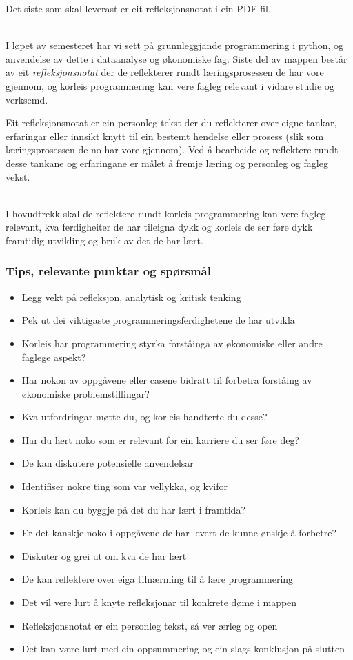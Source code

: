 \documentclass[12pt, titlepage]{article}
\begin{document}
Det siste som skal leverast er eit refleksjonsnotat i ein PDF-fil.

~\\
I løpet av semesteret har vi sett på grunnleggjande programmering i python, og anvendelse av dette i dataanalyse og økonomiske fag.
Siste del av mappen består av eit \textit{refleksjonsnotat} der de reflekterer rundt læringsprosessen de har vore gjennom, og korleis programmering kan vere fagleg relevant i vidare studie og verksemd.

Eit refleksjonsnotat er ein personleg tekst der du reflekterer over eigne tankar, erfaringar eller innsikt knytt til ein bestemt hendelse eller prosess (slik som læringsprosessen de no har vore gjennom).
Ved å bearbeide og reflektere rundt desse tankane og erfaringane er målet å fremje læring og personleg og fagleg vekst.

~\\
I hovudtrekk skal de reflektere rundt korleis programmering kan vere fagleg relevant, kva ferdigheiter de har tileigna dykk og korleis de ser føre dykk framtidig utvikling og bruk av det de har lært.\\
\subsubsection*{Tips, relevante punktar og spørsmål}
\begin{itemize}
   \item{Legg vekt på refleksjon, analytisk og kritisk tenking}
   \item{Pek ut dei viktigaste programmeringsferdighetene de har utvikla}
   \item{Korleis har programmering styrka forståinga av økonomiske eller andre faglege aspekt?}
   \item{Har nokon av oppgåvene eller casene bidratt til forbetra forståing av økonomiske problemstillingar?}
   \item{Kva utfordringar møtte du, og korleis handterte du desse?}
   \item{Har du lært noko som er relevant for ein karriere du ser føre deg?}
   \item{De kan diskutere potensielle anvendelsar}
   \item{Identifiser nokre ting som var vellykka, og kvifor}
   \item{Korleis kan du byggje på det du har lært i framtida?}
   \item{Er det kanskje noko i oppgåvene de har levert de kunne ønskje å forbetre?}
   \item{Diskuter og grei ut om kva de har lært}
   \item{De kan reflektere over eiga tilnærming til å lære programmering}
   \item{Det vil vere lurt å knyte refleksjonar til konkrete døme i mappen}
   \item{Refleksjonsnotat er ein personleg tekst, så ver ærleg og open}
   \item{Det kan være lurt med ein oppsummering og ein slags konklusjon på slutten}
\end{itemize}
\end{document}
